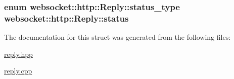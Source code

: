 \subsubsection[{\texorpdfstring{status}{status}}]{\setlength{\rightskip}{0pt plus 5cm}enum {\bf websocket\+::http\+::\+Reply\+::status\+\_\+type}  websocket\+::http\+::\+Reply\+::status}\hypertarget{structwebsocket_1_1http_1_1Reply_afa1b8fc57be88cfc33b7788d37ae42b8}{}\label{structwebsocket_1_1http_1_1Reply_afa1b8fc57be88cfc33b7788d37ae42b8}


The documentation for this struct was generated from the following files\+:\begin{DoxyCompactItemize}
\item 
\hyperlink{reply_8hpp}{reply.\+hpp}\item 
\hyperlink{reply_8cpp}{reply.\+cpp}\end{DoxyCompactItemize}
